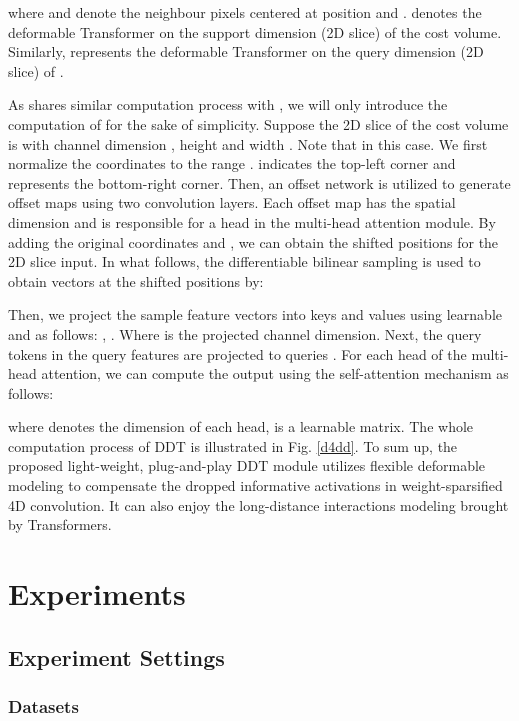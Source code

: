 \documentclass[runningheads]{llncs}
\begin{document}
where  and  denote the neighbour pixels centered at position  and .  denotes the deformable Transformer on the support dimension (2D slice) of the cost volume. Similarly,  represents the deformable Transformer on the query dimension (2D slice) of . 

As  shares similar computation process with , we will only introduce the computation of  for the sake of simplicity. Suppose the 2D slice  of the cost volume is with channel dimension , height  and width . Note that  in this case. We first normalize the coordinates to the range .  indicates the top-left corner and  represents the bottom-right corner. Then, an offset network is utilized to generate  offset maps  using two convolution layers. Each offset map has the spatial dimension  and is responsible for a head in the multi-head attention module. By adding the original coordinates  and , we can obtain the shifted positions for the 2D slice input. In what follows, the differentiable bilinear sampling is used to obtain vectors  at the shifted positions by:

Then, we project the sample feature vectors into keys  and values  using learnable  and  as follows:
, . Where  is the projected channel dimension. Next, the query tokens  in the query features are projected to queries . For each head of the multi-head attention, we can compute the output  using the self-attention mechanism as follows: 

where  denotes the dimension of each head,  is a learnable matrix.
The whole computation process of DDT is illustrated in Fig. \ref{d4dd}. To sum up, the proposed light-weight, plug-and-play DDT module utilizes flexible deformable modeling to compensate the dropped informative activations in weight-sparsified 4D convolution. It can also enjoy the long-distance interactions modeling brought by Transformers.
\section{Experiments}

\subsection{Experiment Settings}

\subsubsection{Datasets}
\end{document}
